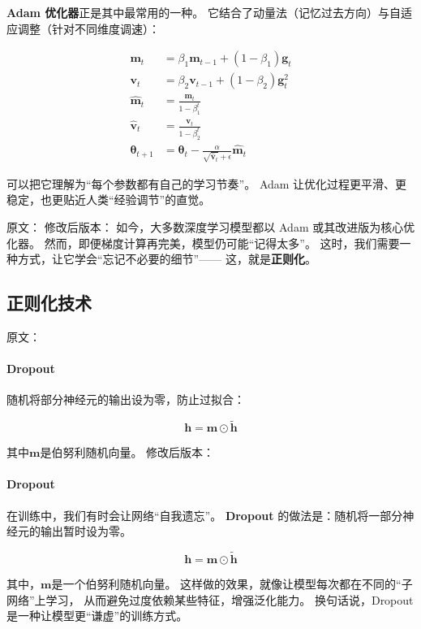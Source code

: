 \textbf{Adam 优化器}正是其中最常用的一种。  
它结合了动量法（记忆过去方向）与自适应调整（针对不同维度调速）：  

\begin{align}
\mathbf{m}_t &= \beta_1 \mathbf{m}_{t-1} + (1-\beta_1) \mathbf{g}_t \\
\mathbf{v}_t &= \beta_2 \mathbf{v}_{t-1} + (1-\beta_2) \mathbf{g}_t^2 \\
\hat{\mathbf{m}}_t &= \frac{\mathbf{m}_t}{1-\beta_1^t} \\
\hat{\mathbf{v}}_t &= \frac{\mathbf{v}_t}{1-\beta_2^t} \\
\boldsymbol{\theta}_{t+1} &= \boldsymbol{\theta}_t - \frac{\alpha}{\sqrt{\hat{\mathbf{v}}_t} + \epsilon} \hat{\mathbf{m}}_t
\end{align}

可以把它理解为“每个参数都有自己的学习节奏”。  
Adam 让优化过程更平滑、更稳定，也更贴近人类“经验调节”的直觉。



原文：
修改后版本：
如今，大多数深度学习模型都以 Adam 或其改进版为核心优化器。  
然而，即便梯度计算再完美，模型仍可能“记得太多”。  
这时，我们需要一种方式，让它学会“忘记不必要的细节”——  
这，就是\textbf{正则化}。

\subsection{正则化技术}

原文：
\paragraph{Dropout}
随机将部分神经元的输出设为零，防止过拟合：

$$\mathbf{h} = \mathbf{m} \odot \tilde{\mathbf{h}}$$

其中$\mathbf{m}$是伯努利随机向量。
修改后版本：
\paragraph{Dropout}  
在训练中，我们有时会让网络“自我遗忘”。  
\textbf{Dropout} 的做法是：随机将一部分神经元的输出暂时设为零。  

$$\mathbf{h} = \mathbf{m} \odot \tilde{\mathbf{h}}$$

其中，$\mathbf{m}$是一个伯努利随机向量。  
这样做的效果，就像让模型每次都在不同的“子网络”上学习，  
从而避免过度依赖某些特征，增强泛化能力。  
换句话说，Dropout 是一种让模型更“谦虚”的训练方式。  



